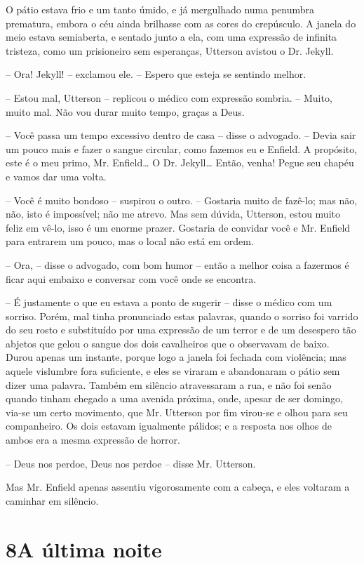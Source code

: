 O pátio estava frio e um tanto úmido, e já mergulhado numa penumbra
prematura, embora o céu ainda brilhasse com as cores do crepúsculo.  A
janela do meio estava semiaberta, e sentado junto a ela, com uma
expressão de infinita tristeza, como um prisioneiro sem esperanças,
Utterson avistou o Dr. Jekyll.  

-- Ora!  Jekyll! -- exclamou ele.  -- Espero que esteja se sentindo
melhor.

-- Estou mal, Utterson -- replicou o médico com expressão sombria. --
Muito, muito mal.  Não vou durar muito tempo, graças a Deus.

-- Você passa um tempo excessivo dentro de casa -- disse o advogado. --
Devia sair um pouco mais e fazer o sangue circular, como fazemos eu e
Enfield. A propósito, este é o meu primo, Mr. Enfield\ldots{}  O Dr.
Jekyll\ldots{} Então, venha!  Pegue seu chapéu e vamos dar uma volta. 

-- Você é muito bondoso -- suspirou o outro. -- Gostaria muito de
fazê-lo; mas não, não, isto é impossível; não me atrevo.  Mas sem
dúvida, Utterson, estou muito feliz em vê-lo, isso é um enorme prazer. 
Gostaria de convidar você e Mr. Enfield para entrarem um pouco, mas o
local não está em ordem. 

-- Ora, -- disse o advogado, com bom humor -- então a melhor coisa a
fazermos é ficar aqui embaixo e conversar com você onde se encontra.

-- É justamente o que eu estava a ponto de sugerir -- disse o médico com
um sorriso.  Porém, mal tinha pronunciado estas palavras, quando o
sorriso foi varrido do seu rosto e substituído por uma expressão de um
terror e de um desespero tão abjetos que gelou o sangue dos dois
cavalheiros que o observavam de baixo.  Durou apenas um instante,
porque logo a janela foi fechada com violência; mas aquele vislumbre
fora suficiente, e eles se viraram e abandonaram o pátio sem dizer uma
palavra.  Também em silêncio atravessaram a rua, e não foi senão quando
tinham chegado a uma avenida próxima, onde, apesar de ser domingo, via-se
um certo movimento, que Mr. Utterson por fim virou-se e olhou para seu
companheiro.  Os dois estavam igualmente pálidos; e a resposta nos
olhos de ambos era a mesma expressão de horror.

-- Deus nos perdoe, Deus nos perdoe -- disse Mr. Utterson.

Mas Mr. Enfield apenas assentiu vigorosamente com a cabeça, e eles
voltaram a caminhar em silêncio.


\chapter[8 -- A última noite]{8\break A última noite}

